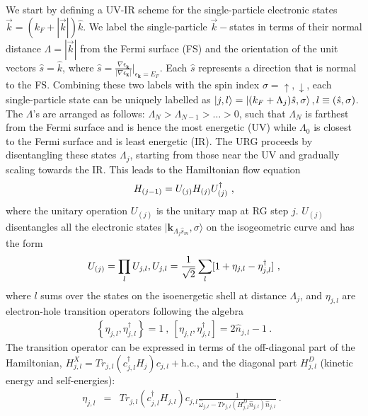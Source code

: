 \documentclass{iopart}
\begin{document}
We start by defining a UV-IR scheme for the single-particle electronic states \(\vec k = (k_F + |\vec k|) \hat k\).
We label the single-particle \(\vec k-\)states in terms of their normal distance $\Lambda = |\vec k|$ from the Fermi surface (FS) and the orientation of the unit vectors $\hat{s} = \hat k$, where $\hat{s}=\frac{\nabla\epsilon_{\mathbf{k}}}{|\nabla\epsilon_{\mathbf{k}}|}|_{\epsilon_{\mathbf{k}}=E_{F}}$.
Each \(\hat s\) represents a direction that is normal to the FS.
Combining these two labels with the spin index \(\sigma=\uparrow,\downarrow\), each single-particle state can be uniquely labelled as $\ket{j,l} = \ket{(k_F + \Lambda_j) \hat s,\sigma}, l\equiv (\hat{s},\sigma)$.
The $\Lambda$'s are arranged as follows: $\Lambda_{N}>\Lambda_{N-1}>\ldots>0$, such that \(\Lambda_N\) is farthest from the Fermi surface and is hence the most energetic (UV) while \(\Lambda_0\) is closest to the Fermi surface and is least energetic (IR).
The URG proceeds by disentangling these states \(\Lambda_j\), starting from those near the UV and gradually scaling towards the IR.
This leads to the Hamiltonian flow equation~\cite{anirbanurg1}
\begin{eqnarray}
\centering
\label{urg_map}
H_{(j-1)}=U_{(j)}H_{(j)}U^{\dagger}_{(j)}~,
\end{eqnarray}
where the unitary operation $U_{(j)}$ is the unitary map at RG step $j$. 
$U_{(j)}$ disentangles all the electronic states 
$|\mathbf{k}_{\Lambda_{j}\hat{s}_{m}},\sigma\rangle$
on the isogeometric curve and has the form~\cite{anirbanmott1,anirbanurg1}
\begin{eqnarray}
\centering U_{(j)}=\prod_{l}U_{j,l}, U_{j,l}=\frac{1}{\sqrt{2}}\sum_l [1+\eta_{j,l}-\eta^{\dagger}_{j,l}]~,
\end{eqnarray}
where \(l\) sums over the states on the isoenergetic shell at distance \(\Lambda_j\), and $\eta_{j,l}$ are electron-hole transition operators following the algebra
\begin{eqnarray}
	\left\{\eta_{j,l},\eta_{j,l}^{\dagger}\right\} = 1~,~\left[\eta_{j,l},\eta_{j,l}^{\dagger}\right] = 2\hat n_{j,l} - 1~.
\end{eqnarray}
The transition operator can be expressed in terms of the off-diagonal part of the Hamiltonian, \(H^X_{j,l} = Tr_{j,l}(c^{\dagger}_{j,l}H_{j})c_{j,l} + \text{h.c.}\), and the diagonal part \(H^D_{j,l}\) (kinetic energy and self-energies):
\begin{eqnarray}
	\eta_{j,l}&=&Tr_{j,l}(c^{\dagger}_{j,l}H_{j,l})c_{j,l}\frac{1}{\hat{\omega}_{j,l}-Tr_{j,l}(H^{D}_{j,l}\hat{n}_{j,l})\hat{n}_{j,l}}~.~~\label{e-TransOp}
\end{eqnarray}
\end{document}
